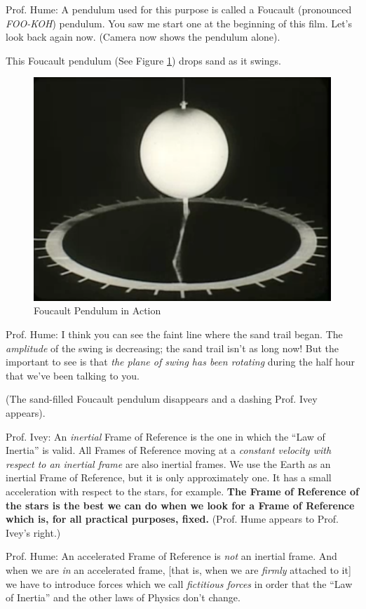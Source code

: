 \documentclass[a6paper]{article}
\begin{document}
Prof. Hume: A pendulum used for this purpose is called a Foucault (pronounced \emph{FOO-KOH}) pendulum. You saw me start one at the beginning of this film. Let's look back again now. (Camera now shows the pendulum alone).

This Foucault pendulum (See Figure \ref{fig: foucault-pendulum-3}) drops sand as it swings. 
        \begin{figure}[h!]
            \centering
            \includegraphics[width=0.5\linewidth]{foucault-pendulum-3.png}
            \caption{Foucault Pendulum in Action}
            \label{fig: foucault-pendulum-3}
        \end{figure}

Prof. Hume: I think you can see the faint line where the sand trail began. The \emph{amplitude} of the swing is decreasing; the sand trail isn't as long now! But the important to see is that \emph{the plane of swing has been rotating} during the half hour that we've been talking to you. 

(The sand-filled Foucault pendulum disappears and a dashing Prof. Ivey appears).

Prof. Ivey: An \emph{inertial} Frame of Reference is the one in which the ``Law of Inertia'' is valid. All Frames of Reference moving at a \emph{constant velocity with respect to an inertial frame} are also inertial frames. We use the Earth as an inertial Frame of Reference, but it is only approximately one. It has a small acceleration with respect to the stars, for example. \textbf{The Frame of Reference of the stars is the best we can do when we look for a Frame of Reference which is, for all practical purposes, fixed.} (Prof. Hume appears to Prof. Ivey's right.) 

Prof. Hume: An accelerated Frame of Reference is \emph{not} an inertial frame. And when we are \emph{in} an accelerated frame, [that is, when we are \emph{firmly} attached to it] we have to introduce forces which we call \emph{fictitious forces} in order that the ``Law of Inertia'' and the other laws of Physics don't change. 
\end{document}

